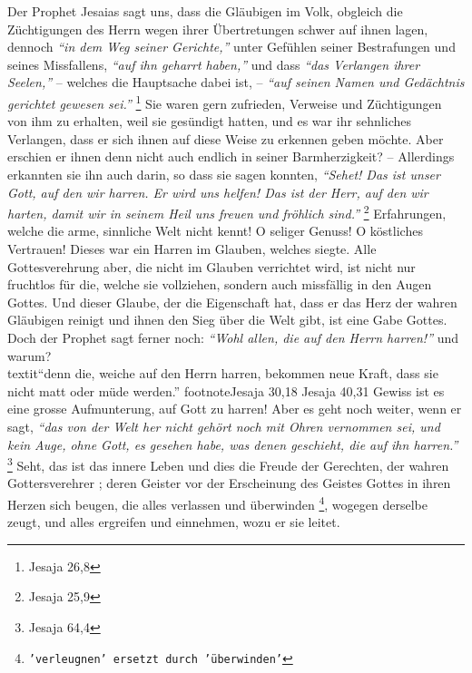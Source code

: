 Der Prophet Jesaias sagt uns, dass die Gläubigen im Volk, obgleich die
Züchtigungen des Herrn wegen ihrer Übertretungen schwer auf ihnen lagen,
dennoch
\textit{"`in dem Weg seiner Gerichte,"'} unter Gefühlen seiner Bestrafungen und
seines Missfallens, \textit{"`auf ihn geharrt haben,"'} und dass \textit{"`das
Verlangen ihrer Seelen,"'} -- welches die Hauptsache dabei ist, --
\textit{"`auf seinen Namen und Gedächtnis gerichtet gewesen sei."'}
\footnote{Jesaja 26,8}
Sie waren gern
zufrieden, Verweise und Züchtigungen von ihm zu erhalten, weil sie gesündigt
hatten, und es war ihr sehnliches Verlangen, dass er sich ihnen auf diese Weise
zu erkennen geben möchte. Aber erschien er ihnen denn
nicht auch endlich in
seiner Barmherzigkeit?  -- Allerdings erkannten sie ihn auch darin, so dass sie
sagen konnten,
\textit{"`Sehet! Das ist unser Gott, auf den wir harren. Er wird uns
helfen! Das ist der Herr, auf den wir harten, damit wir in seinem Heil uns
freuen und fröhlich sind."'}
\footnote{Jesaja 25,9}
Erfahrungen, welche die arme,
sinnliche Welt nicht kennt!  O seliger Genuss! O köstliches
Vertrauen! Dieses war
ein Harren im Glauben, welches siegte. Alle Gottesverehrung aber, die nicht im
Glauben verrichtet wird, ist nicht nur fruchtlos
 für die, welche sie vollziehen,
sondern auch missfällig in den Augen Gottes. Und dieser Glaube, der die
Eigenschaft hat, dass er das Herz der wahren Gläubigen reinigt und ihnen den
Sieg über die Welt gibt, ist eine Gabe Gottes. Doch
der Prophet sagt
ferner noch:
\textit{"`Wohl allen, die auf den Herrn harren!"'} und warum?\\textit{"`denn
die, weiche
auf den Herrn harren, bekommen neue Kraft, dass sie nicht matt oder müde
werden."'}
footnote{Jesaja 30,18 Jesaja 40,31}
Gewiss ist es eine grosse Aufmunterung, auf Gott
zu harren! Aber es geht noch weiter, wenn er sagt,
\textit{"`das von der Welt her
nicht gehört noch mit Ohren vernommen sei, und kein Auge, ohne Gott, es gesehen
habe, was denen geschieht, die auf ihn harren."'}
\footnote{Jesaja 64,4}
Seht, das ist das innere Leben und dies die Freude der Gerechten, der wahren
Gottersverehrer ;
deren Geister vor der Erscheinung des Geistes Gottes in ihren Herzen sich
beugen, die alles verlassen und überwinden \footnote{\texttt{'verleugnen'
ersetzt
durch 'überwinden'}}, wogegen derselbe zeugt, und alles
ergreifen und einnehmen, wozu er sie leitet.

